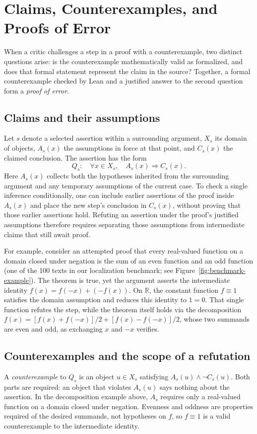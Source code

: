 \section{Claims, Counterexamples, and Proofs of Error}
\label{sec:evidence}
\label{sec:methods}

When a critic challenges a step in a proof with a counterexample, two distinct questions arise: is the counterexample mathematically valid as formalized, and does that formal statement represent the claim in the source? Together, a formal counterexample checked by Lean and a justified answer to the second question form a \emph{proof of error}.

\subsection{Claims and their assumptions}
Let $s$ denote a selected assertion within a surrounding argument, $X_s$ its domain of objects, $A_s(x)$ the assumptions in force at that point, and $C_s(x)$ the claimed conclusion. The assertion has the form
\begin{equation}
Q_s:\quad \forall x\in X_s,\quad A_s(x)\Rightarrow C_s(x).
\label{eq:source-claim}
\end{equation}
Here $A_s(x)$ collects both the hypotheses inherited from the surrounding argument and any temporary assumptions of the current case. To check a single inference conditionally, one can include earlier assertions of the proof inside $A_s(x)$ and place the new step's conclusion in $C_s(x)$, without proving that those earlier assertions hold. Refuting an assertion under the proof's justified assumptions therefore requires separating those assumptions from intermediate claims that still await proof.

For example, consider an attempted proof that every real-valued function on a domain closed under negation is the sum of an even function and an odd function (one of the 100 texts in our localization benchmark; see Figure~\ref{fig:benchmark-example}). The theorem is true, yet the argument asserts the intermediate identity $f(x)=f(-x)+(-f(x))$. On $\mathbb{R}$, the constant function $f\equiv 1$ satisfies the domain assumption and reduces this identity to $1=0$. That single function refutes the step, while the theorem itself holds via the decomposition $f(x)=[f(x)+f(-x)]/2+[f(x)-f(-x)]/2$, whose two summands are even and odd, as exchanging $x$ and $-x$ verifies.

\subsection{Counterexamples and the scope of a refutation}
A \emph{counterexample} to $Q_s$ is an object $u\in X_s$ satisfying $A_s(u)\wedge\neg C_s(u)$. Both parts are required: an object that violates $A_s(u)$ says nothing about the assertion. In the decomposition example above, $A_s$ requires only a real-valued function on a domain closed under negation. Evenness and oddness are properties required of the desired summands, not hypotheses on $f$, so $f\equiv 1$ is a valid counterexample to the intermediate identity.

